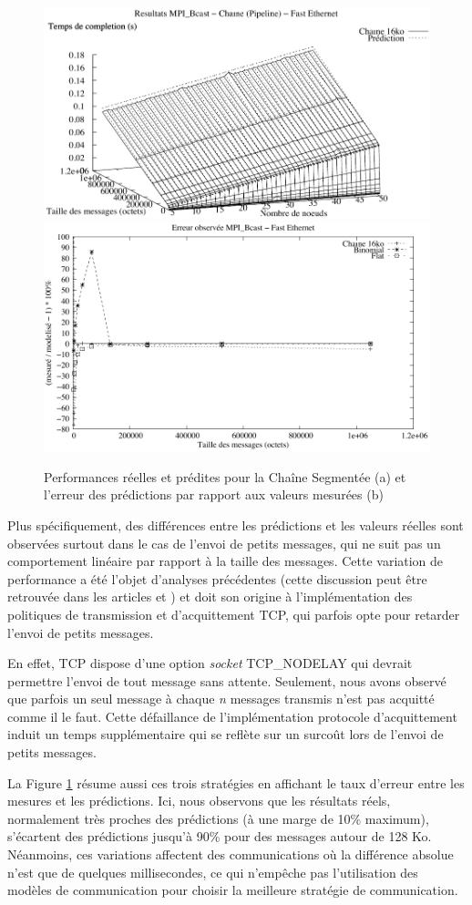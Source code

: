 %
\begin{figure}[h]
	\centering
	\includegraphics[width=0.5\linewidth]{images/modeles/FEth/Bcast/comp_Chain_16384}\includegraphics[width=0.5\linewidth]{images/modeles/FEth/Bcast/error}
	\caption{\label{Figure:Comparison-Bcast-Chain_FEth}Performances réelles
		et prédites pour la Chaîne Segmentée (a)  et l'erreur des prédictions par rapport
		aux valeurs mesurées (b)}
\end{figure}

Plus spécifiquement, des différences entre les prédictions et les
valeurs réelles sont observées surtout dans le cas de l'envoi de petits messages, qui ne suit pas un comportement linéaire
par rapport à la taille des messages. Cette variation de performance
a été l'objet d'analyses précédentes (cette discussion peut être retrouvée
dans les articles \cite{Steffenel04a} et \cite{Steffenel04c}) et doit son origine à l'implémentation des politiques de 
transmission et d'acquittement TCP, qui parfois opte pour retarder l'envoi de petits messages. 

En effet, TCP dispose d'une option \emph{socket} TCP\_NODELAY qui devrait permettre l'envoi de tout message sans attente. 
Seulement, nous avons observé que parfois un seul message
à chaque \emph{n} messages transmis n'est pas acquitté comme il le
faut. Cette défaillance de l'implémentation protocole d'acquittement induit un temps supplémentaire
 qui se reflète sur un surcoût lors de l'envoi de petits messages.  


La Figure \ref{Figure:Comparison-Bcast-Chain_FEth} résume aussi ces trois stratégies en affichant le taux d'erreur entre les mesures et les prédictions.
Ici, nous observons que les résultats réels, normalement très proches
des prédictions (à une marge de 10\% maximum), s'écartent des prédictions
jusqu'à 90\% pour des messages autour de 128 Ko. Néanmoins, ces variations
affectent des communications où la différence absolue n'est que de
quelques millisecondes, ce qui n'empêche pas l'utilisation des modèles
de communication pour choisir la meilleure stratégie de communication. 


